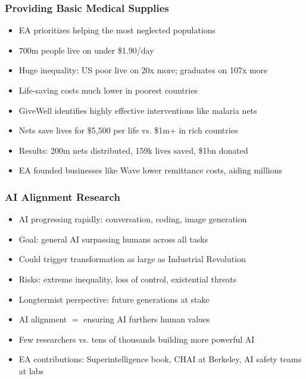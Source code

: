 \begin{frame}[fragile]\frametitle{Providing Basic Medical Supplies}
      \begin{itemize}
        \item EA prioritizes helping the most neglected populations
        \item 700m people live on under \$1.90/day
        \item Huge inequality: US poor live on 20x more; graduates on 107x more
        \item Life-saving costs much lower in poorest countries
        \item GiveWell identifies highly effective interventions like malaria nets
        \item Nets save lives for \$5,500 per life vs. \$1m+ in rich countries
        \item Results: 200m nets distributed, 159k lives saved, \$1bn donated
        \item EA founded businesses like Wave lower remittance costs, aiding millions
      \end{itemize}
\end{frame}

\begin{frame}[fragile]\frametitle{AI Alignment Research}
      \begin{itemize}
        \item AI progressing rapidly: conversation, coding, image generation
        \item Goal: general AI surpassing humans across all tasks
        \item Could trigger transformation as large as Industrial Revolution
        \item Risks: extreme inequality, loss of control, existential threats
        \item Longtermist perspective: future generations at stake
        \item AI alignment $=$ ensuring AI furthers human values
        \item Few researchers vs. tens of thousands building more powerful AI
        \item EA contributions: Superintelligence book, CHAI at Berkeley, AI safety teams at labs
      \end{itemize}
\end{frame}

